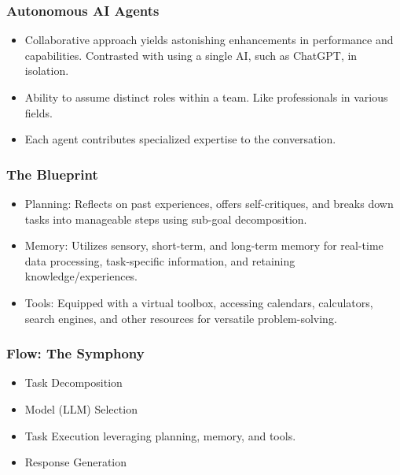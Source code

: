 \begin{frame}[fragile]\frametitle{Autonomous AI Agents}
  \begin{itemize}
    \item Collaborative approach yields astonishing enhancements in performance and capabilities. Contrasted with using a single AI, such as ChatGPT, in isolation.
    \item Ability to assume distinct roles within a team. Like professionals in various fields.
    \item Each agent contributes specialized expertise to the conversation.
  \end{itemize}
\end{frame}

\begin{frame}[fragile]\frametitle{The Blueprint}
  \begin{itemize}
    \item Planning: Reflects on past experiences, offers self-critiques, and breaks down tasks into manageable steps using sub-goal decomposition.
    \item Memory: Utilizes sensory, short-term, and long-term memory for real-time data processing, task-specific information, and retaining knowledge/experiences.
    \item Tools: Equipped with a virtual toolbox, accessing calendars, calculators, search engines, and other resources for versatile problem-solving.
  \end{itemize}
\end{frame}

\begin{frame}[fragile]\frametitle{Flow: The Symphony}
  \begin{itemize}
    \item Task Decomposition %
    \item Model (LLM) Selection %
    \item Task Execution leveraging planning, memory, and tools.
    \item Response Generation %
  \end{itemize}
\end{frame}


